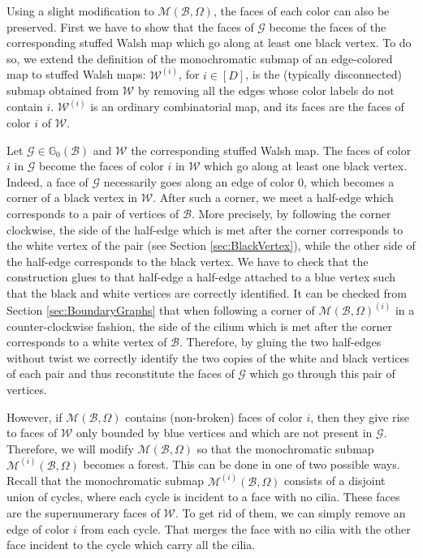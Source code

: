 \documentclass[aps,prd,10pt,notitlepage,nofootinbib,superscriptaddress,showkeys,showpacs]{revtex4-1}
\begin{document}
Using a slight modification to ${\mathcal{M}}({\mathcal{B}}, \Omega)$, the faces of each color can also be preserved. First we have to show that the faces of ${\mathcal{G}}$ become the faces of the corresponding stuffed Walsh map which go along at least one black vertex. To do so, we extend the definition of the monochromatic submap of an edge-colored map to stuffed Walsh maps: ${\mathcal{W}}^{(i)}$, for $i\in[D]$, is the (typically disconnected) submap obtained from ${\mathcal{W}}$ by removing all the edges whose color labels do not contain $i$. ${\mathcal{W}}^{(i)}$ is an ordinary combinatorial map, and its faces are the faces of color $i$ of ${\mathcal{W}}$.

Let ${\mathcal{G}}\in{\mathbb{G}}_0({\mathcal{B}})$ and ${\mathcal{W}}$ the corresponding stuffed Walsh map. The faces of color $i$ in ${\mathcal{G}}$ become the faces of color $i$ in ${\mathcal{W}}$ which go along at least one black vertex. Indeed, a face of ${\mathcal{G}}$ necessarily goes along an edge of color 0, which becomes a corner of a black vertex in ${\mathcal{W}}$. After such a corner, we meet a half-edge which corresponds to a pair of vertices of ${\mathcal{B}}$. More precisely, by following the corner clockwise, the side of the half-edge which is met after the corner corresponds to the white vertex of the pair (see Section \ref{sec:BlackVertex}), while the other side of the half-edge corresponds to the black vertex. We have to check that the construction glues to that half-edge a half-edge attached to a blue vertex such that the black and white vertices are correctly identified. It can be checked from Section \ref{sec:BoundaryGraphs} that when following a corner of ${\mathcal{M}}({\mathcal{B}}, \Omega)^{(i)}$ in a counter-clockwise fashion, the side of the cilium which is met after the corner corresponds to a white vertex of ${\mathcal{B}}$. Therefore, by gluing the two half-edges without twist we correctly identify the two copies of the white and black vertices of each pair and thus reconstitute the faces of ${\mathcal{G}}$ which go through this pair of vertices.

However, if ${\mathcal{M}}({\mathcal{B}}, \Omega)$ contains (non-broken) faces of color $i$, then they give rise to faces of ${\mathcal{W}}$ only bounded by blue vertices and which are not present in ${\mathcal{G}}$. Therefore, we will modify ${\mathcal{M}}({\mathcal{B}}, \Omega)$ so that the monochromatic submap ${\mathcal{M}}^{(i)}({\mathcal{B}}, \Omega)$ becomes a forest. This can be done in one of two possible ways. Recall that the monochromatic submap ${\mathcal{M}}^{(i)}({\mathcal{B}}, \Omega)$ consists of a disjoint union of cycles, where each cycle is incident to a face with no cilia. These faces are the supernumerary faces of ${\mathcal{W}}$. To get rid of them, we can simply remove an edge of color $i$ from each cycle. That merges the face with no cilia with the other face incident to the cycle which carry all the cilia.
\end{document}
